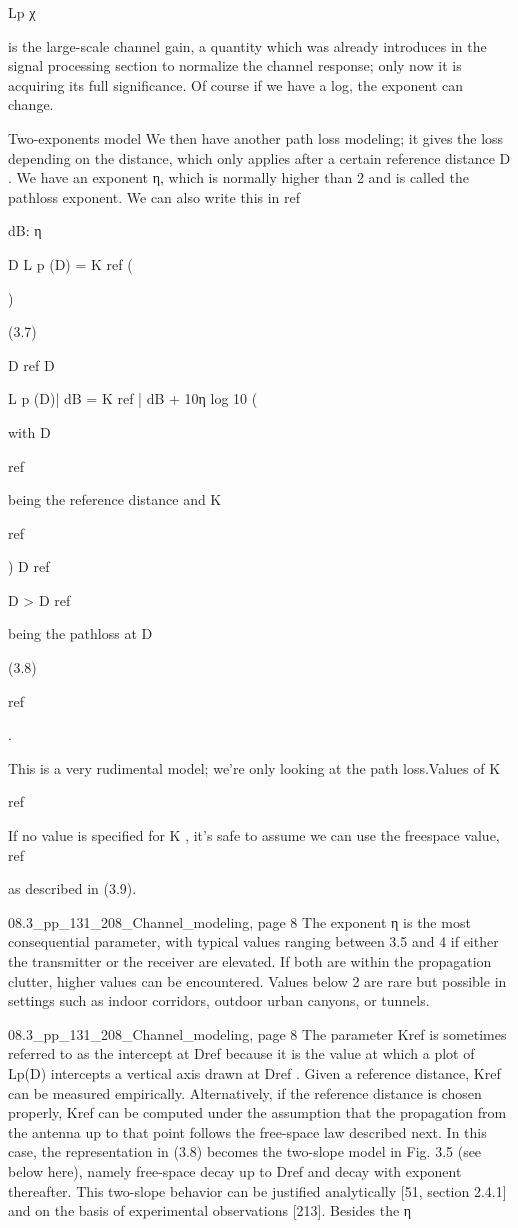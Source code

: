 {{{Lp χ

is the large-scale channel gain, a quantity which was already introduces in the signal processing section to normalize the channel response; only now it is acquiring its full significance.
Of course if we have a log, the exponent can change.

Two-exponents model We then have another path loss modeling; it gives the loss depending on the distance,
which only applies after a certain reference distance D . We have an exponent η, which is normally higher than 2 and is called the pathloss exponent. We can also write this in ref

dB:
η

D L p (D) = K ref (

)

(3.7)

D ref D

L p (D)| dB = K ref | dB + 10η log 10 (

with D

ref

being the reference distance and K

ref

)
D ref

D > D ref

being the pathloss at D

(3.8)

ref

.

This is a very rudimental model; we're only looking at the path loss.
​Values of K

ref

If no value is specified for K , it's safe to assume we can use the freespace value,
ref

as described in (3.9).

08.3_pp_131_208_Channel_modeling, page 8 The exponent η is the most consequential parameter, with typical values ranging between 3.5 and 4 if either the transmitter or the receiver are elevated. If both are within the propagation clutter, higher values can be encountered. Values below 2 are rare but possible in settings such as indoor corridors, outdoor urban canyons, or tunnels.

08.3_pp_131_208_Channel_modeling, page 8 The parameter Kref is sometimes referred to as the intercept at Dref because it is the value at which a plot of Lp(D) intercepts a vertical axis drawn at Dref . Given a reference distance, Kref can be measured empirically. Alternatively, if the reference distance is chosen properly, Kref can be computed under the assumption that the propagation from the antenna up to that point follows the free-space law described next. In this case, the representation in (3.8) becomes the two-slope model in Fig.
3.5 (see below here), namely free-space decay up to Dref and decay with exponent thereafter. This two-slope behavior can be justified analytically [51, section 2.4.1] and on the basis of experimental observations [213]. Besides the η

}}}
